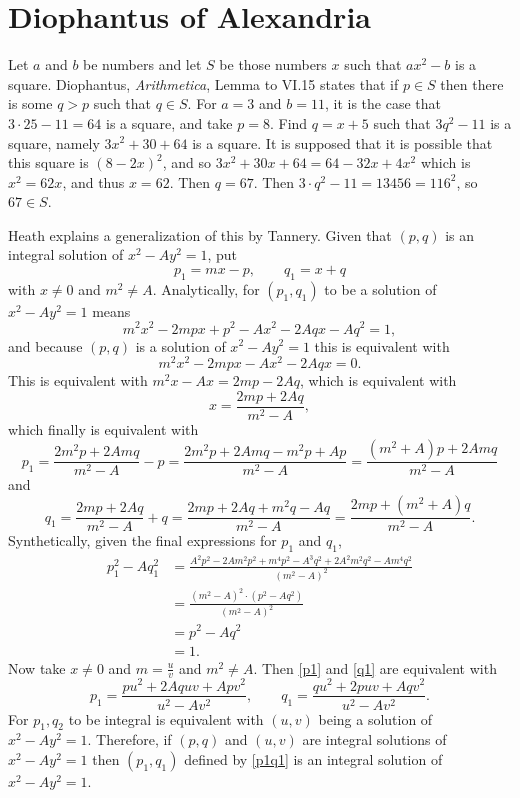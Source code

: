 \documentclass{article}
\theoremstyle{definition}
\begin{document}
\section{Diophantus of Alexandria}
Let $a$ and $b$ be numbers and let $S$ be those numbers $x$ such that $ax^2-b$ is a square. Diophantus, {\em Arithmetica}, Lemma to VI.15 \cite[p.~238]{diophantus}
states that if $p \in S$ then there is some $q>p$ such that $q \in S$. 
For $a=3$ and $b=11$, it is the case that $3\cdot 25-11=64$ is a square, and take $p=8$. 
Find $q=x+5$ such that $3q^2-11$ is a square, namely $3x^2+30+64$ is a square. It is supposed that it is possible that
this square is $(8-2x)^2$, and so $3x^2+30x+64=64-32x+4x^2$ which is $x^2=62x$, and thus $x=62$.   Then
$q=67$. Then $3\cdot q^2-11=13456=116^2$, so $67 \in S$. 

Heath  \cite[pp.~279--280]{diophantus} explains a generalization of this by Tannery. 
Given that $(p,q)$ is an integral solution of $x^2-Ay^2=1$,
put
\[
p_1=mx-p,\qquad q_1=x+q
\]
with $x \neq 0$ and $m^2 \neq A$.
Analytically, for $(p_1,q_1)$ to be a solution of $x^2-Ay^2=1$ means 
\[
m^2x^2-2mpx+p^2-Ax^2-2Aqx-Aq^2=1,
\]
and because $(p,q)$ is a solution of $x^2-Ay^2=1$ this is equivalent with
\[
m^2x^2-2mpx-Ax^2-2Aqx=0.
\]
This is equivalent with $m^2x-Ax=2mp-2Aq$, which is equivalent with
\[
x =  \frac{2mp+2Aq}{m^2-A},
\]
which finally is  equivalent with
\begin{equation}
p_1=\frac{2m^2p+2Amq}{m^2-A}-p=\frac{2m^2p+2Amq-m^2p+Ap}{m^2-A}
=\frac{(m^2+A)p+2Amq}{m^2-A}
\label{p1}
\end{equation}
and
\begin{equation}
q_1 =  \frac{2mp+2Aq}{m^2-A} + q = 
\frac{2mp+2Aq+m^2q-Aq}{m^2-A}
=\frac{2mp+(m^2+A)q}{m^2-A}.
\label{q1}
\end{equation}
Synthetically, given the final expressions for $p_1$ and $q_1$,
\begin{align*}
p_1^2-Aq_1^2 &= \frac{A^2p^2-2Am^2p^2+m^4p^2-A^3q^2+2A^2m^2q^2
-Am^4q^2}{(m^2-A)^2}\\
&=\frac{(m^2-A)^2 \cdot (p^2-Aq^2)}{(m^2-A)^2}\\
&=p^2-Aq^2\\
&=1.
\end{align*}
Now take $x \neq 0$ and $m=\frac{u}{v}$ and $m^2 \neq A$. 
Then \eqref{p1} and \eqref{q1} are equivalent with
\begin{equation}
p_1 = \frac{pu^2+2Aquv+Apv^2}{u^2-Av^2},\qquad
q_1 = \frac{qu^2+2puv+Aqv^2}{u^2-Av^2}.
\label{p1q1}
\end{equation}
For $p_1,q_2$ to be integral is equivalent with $(u,v)$ being a solution
of $x^2-Ay^2=1$. 
Therefore, if $(p,q)$ and $(u,v)$ are integral solutions of
$x^2-Ay^2=1$ then $(p_1,q_1)$ defined by  \eqref{p1q1} is an integral
solution of $x^2-Ay^2=1$. 
\end{document}
